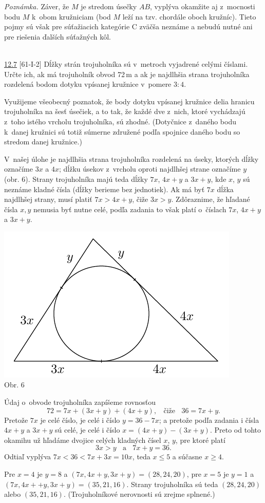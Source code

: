 \textit{Poznámka.} Záver, že $M$ je stredom úsečky $AB$, vyplýva okamžite aj z~mocnosti bodu $M$ k~obom kružniciam (bod $M$ leží na tzv. chordále oboch kružníc). Tieto pojmy sú však pre súťažiacich kategórie C zväčša neznáme a nebudú nutné ani pre riešenia ďalších súťažných kôl.\\
\\
\begin{tcolorbox}[breakable,notitle,boxrule=0pt,colback=light-gray,colframe=light-gray]\ul{12.7} [61-I-2] Dĺžky strán trojuholníka sú v~metroch vyjadrené celými číslami. Určte ich, ak má trojuholník obvod 72\,m a ak je najdlhšia strana trojuholníka rozdelená bodom dotyku vpísanej kružnice v~pomere $3 : 4.$

\end{tcolorbox}

\rieh Využijeme všeobecný poznatok, že body dotyku vpísanej kružnice delia hranicu trojuholníka na šesť úsečiek, a to tak, že každé dve z~nich, ktoré vychádzajú z~toho istého vrcholu trojuholníka, sú zhodné. (Dotyčnice z~daného bodu k~danej kružnici sú totiž súmerne združené podľa spojnice daného bodu so stredom danej kružnice.)

V~našej úlohe je najdlhšia strana trojuholníka rozdelená na úseky, ktorých dĺžky označíme $3x$ a $4x$; dĺžku úsekov z~vrcholu oproti najdlhšej strane označíme $y$ (obr. 6). Strany trojuholníka majú teda dĺžky $7x$, $4x + y$ a $3x + y$, kde $x$, $y$ sú neznáme kladné čísla (dĺžky berieme bez jednotiek). Ak má byť $7x$ dĺžka najdlhšej strany, musí platiť $7x > 4x + y$, čiže $3x > y$. Zdôraznime, že hľadané čísla $x, y$ nemusia byť nutne celé, podľa zadania to však platí o~číslach $7x$, $4x + y$ a $3x + y$.
\begin{center}
\includegraphics{obrazky/61D1}\\

Obr. 6
\end{center}
Údaj o~obvode trojuholníka zapíšeme rovnosťou
$$72 = 7x + (3x + y) + (4x + y), \ \ \ \ \text{čiže} \ \ \ \ 36 = 7x + y.$$
Pretože $7x$ je celé číslo, je celé i číslo $y = 36 - 7x$; a pretože podľa zadania i čísla $4x + y$ a $3x + y$ sú celé, je celé i číslo $x = (4x + y) - (3x + y)$. Preto od tohto okamihu už hľadáme dvojice celých kladných čísel $x$, $y$, pre ktoré platí
$$3x > y \ \ \ \ \text{a}  \ \ \ \ 7x + y = 36.$$
Odtiaľ vyplýva $7x < 36 < 7x + 3x = 10x$, teda $x \leq 5$ a súčasne $x \geq 4$.

Pre $x = 4$ je $y = 8$ a $(7x, 4x+y, 3x+y) = (28, 24, 20)$, pre $x = 5$ je $y = 1$ a $(7x, 4x+ + y, 3x + y) = (35, 21, 16)$. Strany trojuholníka sú teda $(28, 24, 20)$ alebo $(35, 21, 16)$. (Trojuholníkové nerovnosti sú zrejme splnené.)

